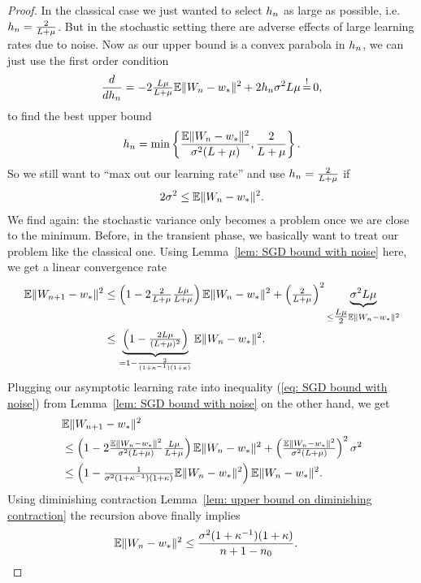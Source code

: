 \begin{proof}
	In the classical case we just wanted to select \(h_n\) as large as possible,
	i.e.\ \(h_n=\tfrac{2}{L+\mu}\). But in the stochastic setting there
	are adverse effects of large learning rates due to noise. Now as our upper bound
	is a convex parabola in \(h_n\), we can just use the first order condition
	\begin{align*}
		\frac{d}{d\lr_n}
		= -2\tfrac{\ubound\lbound}{\ubound+\lbound}
		\E\|\Weights_n - \minimum\|^2 + 2\lr_n \stdBound^2\ubound\lbound
		\xeq{!} 0,
	\end{align*}
	to find the best upper bound
	\begin{align}\label{eq: optimal learning rate SGD}
		h_n
		= \min\left\{
			\frac{\mathbb{E}\|W_n - w_*\|^2}{\sigma^2(L+\mu)},
			\frac{2}{L+\mu}
		\right\}.
	\end{align}
	So we still want to ``max out our learning rate'' and use
	\(h_n=\tfrac{2}{L+\mu}\) if
	\begin{align*}
		2\sigma^2 \le \mathbb{E}\|W_n - w_*\|^2.
	\end{align*}
	We find again: the stochastic variance only becomes a problem once we are
	close to the minimum. Before, in the transient phase, we basically want to
	treat our problem like the classical one. Using Lemma~\ref{lem: SGD bound
	with noise} here, we get a linear convergence rate
	\begin{align*}
		\mathbb{E}\|W_{n+1} - w_*\|^2
		&\le \left(1-2\tfrac{2}{L+\mu}\tfrac{L\mu}{L+\mu}\right)
		\mathbb{E}\|W_n - w_*\|^2 + \left(\tfrac{2}{L+\mu}\right)^2
		\underbrace{\sigma^2L\mu}_{
			\le\tfrac{L\mu}{2} \mathbb{E}\|W_n - w_*\|^2
		}\\
		&\le \underbrace{
			\left(1-\tfrac{2L\mu}{(L+\mu)^2}\right)
		}_{
			=1-\frac{2}{(1+\kappa^{-1})(1+\kappa)}
		}
		\mathbb{E}\|W_n - w_*\|^2.
	\end{align*}
	Plugging our asymptotic learning rate into inequality (\ref{eq: SGD bound
	with noise}) from Lemma~\ref{lem: SGD bound with noise} on the other hand, we
	get
	\begin{align*}
		&\mathbb{E}\|W_{n+1} - w_*\|^2\\
		&\le \left(1-2
			\tfrac{\mathbb{E}\|W_n - w_*\|^2}{\sigma^2(L+\mu)}
			\tfrac{L\mu}{L+\mu}
		\right)
		\mathbb{E}\|W_n - w_*\|^2
		+ \left(
			\tfrac{\mathbb{E}\|W_n - w_*\|^2}{\sigma^2(L+\mu)}
		\right)^2
		\sigma^2\\
		&\le \left(1-
			\tfrac{1}{\sigma^2(1+\kappa^{-1})(1+\kappa)}
			\mathbb{E}\|W_n - w_*\|^2
		\right)
		\mathbb{E}\|W_n - w_*\|^2.
	\end{align*}
	Using diminishing contraction Lemma~\ref{lem: upper bound on diminishing
	contraction} the recursion above finally implies
	\begin{align*}
		\mathbb{E}\|W_n - w_*\|^2
		&\le \frac{\sigma^2(1+\kappa^{-1})(1+\kappa)}{n+1-n_0}.
		\qedhere
	\end{align*}
\end{proof}


